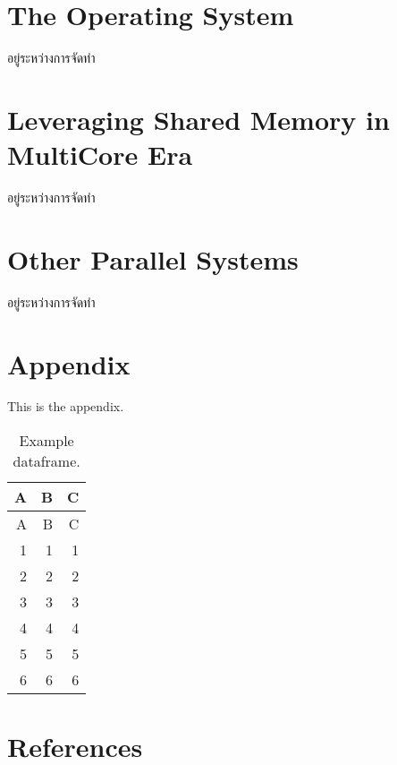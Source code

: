 \documentclass[
  notoc %
]{tufte-book}
\begin{document}
\hypertarget{sec:os}{%
\chapter{The Operating System}\label{sec:os}}

อยู่ระหว่างการจัดทำ

\hypertarget{sec:sharedmem}{%
\chapter{Leveraging Shared Memory in MultiCore
Era}\label{sec:sharedmem}}

อยู่ระหว่างการจัดทำ

\hypertarget{sec:parallelsys}{%
\chapter{Other Parallel Systems}\label{sec:parallelsys}}

อยู่ระหว่างการจัดทำ

\hypertarget{appendix}{%
\chapter*{Appendix}\label{appendix}}

This is the appendix.

\hypertarget{tbl:example_dataframe}{}
\begin{longtable}[]{@{}rrr@{}}
\caption{\label{tbl:example_dataframe}Example dataframe.}\tabularnewline
\toprule()
A & B & C \\
\midrule()
\endfirsthead
\toprule()
A & B & C \\
\midrule()
\endhead
1 & 1 & 1 \\
2 & 2 & 2 \\
3 & 3 & 3 \\
4 & 4 & 4 \\
5 & 5 & 5 \\
6 & 6 & 6 \\
\bottomrule()
\end{longtable}

\hypertarget{references}{%
\chapter*{References}\label{references}}

\backmatter
\end{document}
